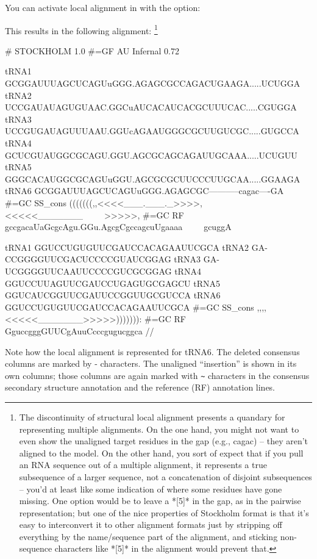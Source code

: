 You can activate local alignment in  with the 
option:


This results in the following alignment:
\footnote{The discontinuity of structural local alignment presents a
quandary for representing multiple alignments. On the one hand, you
might not want to even show the unaligned target residues in the gap
(e.g., cagac) -- they aren't aligned to the model. On the other hand,
you sort of expect that if you pull an RNA sequence out of a multiple
alignment, it represents a true subsequence of a larger sequence, not
a concatenation of disjoint subsequences -- you'd at least like some
indication of where some residues have gone missing. One option would
be to leave a *[5]* in the gap, as in the pairwise
representation; but one of the nice properties of Stockholm format is
that it's easy to interconvert it to other alignment formats just by
stripping off everything by the name/sequence part of the alignment,
and sticking non-sequence characters like *[5]* in the
alignment would prevent that.}

{\samepage
\begin{sreoutput}
# STOCKHOLM 1.0
#=GF AU    Infernal 0.72

tRNA1             GCGGAUUUAGCUCAGUuGGG.AGAGCGCCAGACUGAAGA.....UCUGGA
tRNA2             UCCGAUAUAGUGUAAC.GGCuAUCACAUCACGCUUUCAC.....CGUGGA
tRNA3             UCCGUGAUAGUUUAAU.GGUcAGAAUGGGCGCUUGUCGC.....GUGCCA
tRNA4             GCUCGUAUGGCGCAGU.GGU.AGCGCAGCAGAUUGCAAA.....UCUGUU
tRNA5             GGGCACAUGGCGCAGUuGGU.AGCGCGCUUCCCUUGCAA.....GGAAGA
tRNA6             GCGGAUUUAGCUCAGUuGGG.AGAGCGC-----------cagac----GA
#=GC SS_cons      (((((((,,<<<<___.___._>>>>,<<<<<_______~~~~~>>>>>,
#=GC RF           gccgacaUaGcgcAgu.GGu.AgcgCgccagcuUgaaaa~~~~~gcuggA

tRNA1             GGUCCUGUGUUCGAUCCACAGAAUUCGCA
tRNA2             GA-CCGGGGUUCGACUCCCCGUAUCGGAG
tRNA3             GA-UCGGGGUUCAAUUCCCCGUCGCGGAG
tRNA4             GGUCCUUAGUUCGAUCCUGAGUGCGAGCU
tRNA5             GGUCAUCGGUUCGAUUCCGGUUGCGUCCA
tRNA6             GGUCCUGUGUUCGAUCCACAGAAUUCGCA
#=GC SS_cons      ,,,,<<<<<_______>>>>>))))))):
#=GC RF           GguccgggGUUCgAuuCcccgugucggca
//
\end{sreoutput}
}

Note how the local alignment is represented for tRNA6. The deleted
consensus columns are marked by - characters. The unaligned
``insertion'' is shown in its own columns; those columns are again
marked with \verb+~+ characters in the consensus secondary structure
annotation and the reference (RF) annotation lines.

